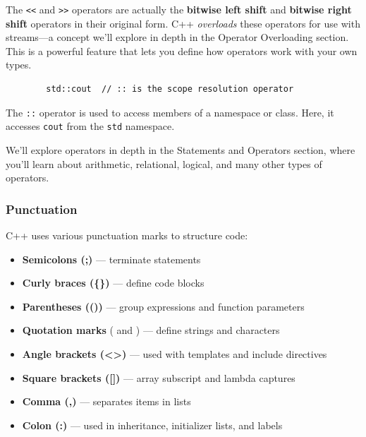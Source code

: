 \begin{remark}
	The \texttt{<<} and \texttt{>>} operators are actually the \textbf{bitwise left shift} and \textbf{bitwise right shift} operators in their original form. C++ \textit{overloads} these operators for use with streams—a concept we'll explore in depth in the Operator Overloading section. This is a powerful feature that lets you define how operators work with your own types.
\end{remark}

\begin{example}{\leavevmode}
	
	\begin{lstlisting}
		std::cout  // :: is the scope resolution operator
	\end{lstlisting}
	
	The \texttt{::} operator is used to access members of a namespace or class. Here, it accesses \texttt{cout} from the \texttt{std} namespace.
\end{example}

We'll explore operators in depth in the Statements and Operators section, where you'll learn about arithmetic, relational, logical, and many other types of operators.

\subsubsection{Punctuation}

C++ uses various punctuation marks to structure code:

\begin{itemize}
	\item \textbf{Semicolons (;)} — terminate statements
	\item \textbf{Curly braces (\{\})} — define code blocks
	\item \textbf{Parentheses (())} — group expressions and function parameters
	\item \textbf{Quotation marks} (\texttt{\textquotedbl\textquotedbl} and \texttt{\textquotesingle\textquotesingle}) --- define strings and characters
	\item \textbf{Angle brackets (<>)} — used with templates and include directives
	\item \textbf{Square brackets ([])} — array subscript and lambda captures
	\item \textbf{Comma (,)} — separates items in lists
	\item \textbf{Colon (:)} — used in inheritance, initializer lists, and labels
\end{itemize}

